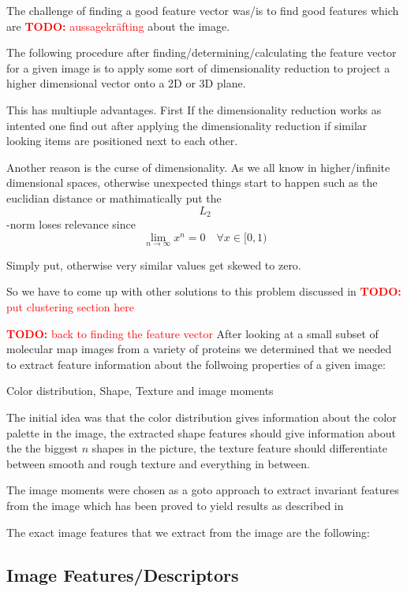 \documentclass[journal]{vgtc}       %
\newcommand{\todo}[1]{\textcolor{red}{\textbf{TODO:} #1}}
\begin{document}
The challenge of finding a good feature vector was/is to find good features which are \todo{aussagekräfting} about the image.

The following procedure after finding/determining/calculating the feature vector for a given image is to apply some sort of dimensionality reduction to project a higher dimensional vector onto a 2D or 3D plane.

This has multiuple advantages. First If the dimensionality reduction works as intented one find out after applying the dimensionality reduction if similar looking items are positioned next to each other.

Another reason is the curse of dimensionality. As we all know in higher/infinite dimensional spaces, otherwise unexpected things start to happen such as the euclidian distance or mathimatically put the \begin{equation} L_2 \end{equation}-norm loses relevance since
\begin{equation}
\lim_{n\rightarrow \infty} x^n = 0 \quad \forall x \in [0,1)
\end{equation}

Simply put, otherwise very similar values get skewed to zero.

So we have to come up with other solutions to this problem discussed in \todo{put clustering section here}


\todo{back to finding the feature vector}
After looking at a small subset of molecular map images from a variety of proteins we determined that we needed to extract feature information about the follwoing properties of a given image: 

Color distribution, Shape, Texture and image moments 

The initial idea was that the color distribution gives information about the color palette in the image, the extracted shape features should give information about the the biggest \( n \) shapes in the picture, the texture feature should differentiate between smooth and rough texture and everything in between.

The image moments were chosen as a goto approach to extract invariant features from the image which has been proved to yield results as described in \cite{kolesar}

The exact image features that we extract from the image are the following:
\subsection{Image Features/Descriptors}
\end{document}
